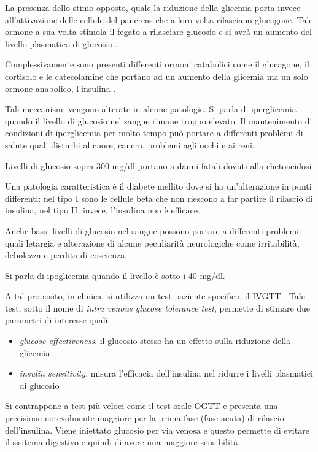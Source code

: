 La presenza dello stimo opposto, quale la riduzione della glicemia porta invece all'attivazione delle cellule del pancreas che a loro volta rilasciano glucagone. Tale ormone a sua volta stimola il fegato a rilasciare glucosio e si avrà un aumento del livello plasmatico di glucosio \cite{sherwood_fisiologia_2008}.

Complessivamente sono presenti differenti ormoni catabolici come il glucagone, il cortisolo e le catecolamine che portano ad un aumento della glicemia ma un solo ormone anabolico, l'insulina \cite{nelson_lehninger_2021}.

Tali meccanismi vengono alterate in alcune patologie. 
Si parla di iperglicemia quando il livello di glucosio nel sangue rimane troppo elevato. Il mantenimento di condizioni di iperglicemia per molto tempo può portare a differenti problemi di salute quali disturbi al cuore, cancro, problemi agli occhi e ai reni. 

Livelli di glucosio sopra 300 mg/dl portano a danni fatali dovuti alla chetoacidosi

Una patologia caratteristica è il diabete mellito dove si ha un'alterazione in punti differenti: nel tipo I sono le cellule beta che non riescono a far partire il rilascio di insulina, nel tipo II, invece, l'insulina non è efficace.

Anche bassi livelli di glucosio nel sangue possono portare a differenti problemi quali letargia e alterazione di alcune peculiarità neurologiche come irritabilità, debolezza e perdita di coscienza.

Si parla di ipoglicemia quando il livello è sotto i 40 mg/dl.

A tal proposito, in clinica, si utilizza un test paziente specifico, il IVGTT \cite{darden_predicting_2020-1}. Tale test, sotto il nome di \textit{intra venous glucose tolerance test}, permette di stimare due parametri di interesse quali:

\begin{itemize}
	\item \textit{glucose effectiveness}, il glucosio stesso ha un effetto sulla riduzione della glicemia
	\item \textit{insulin sensitivity}, misura l'efficacia dell'insulina nel ridurre i livelli plasmatici di glucosio
\end{itemize}

Si contrappone a test più veloci come il test orale OGTT e presenta una precisione notevolmente maggiore per la prima fase (fase acuta) di rilascio dell'insulina. Viene iniettato glucosio per via venosa e questo permette di evitare il sisitema digestivo e quindi di avere una maggiore sensibilità.

